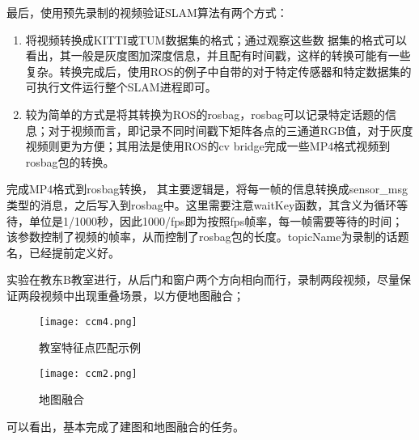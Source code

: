 最后，使用预先录制的视频验证SLAM算法有两个方式：

\begin{enumerate}
	\item 将视频转换成KITTI或TUM数据集的格式；通过观察这些数
	据集的格式可以看出，其一般是灰度图加深度信息，并且配有时间戳，这样的转换可能有一些复杂。转换完成后，使用ROS的例子中自带的对于特定传感器和特定数据集的可执行文件运行整个SLAM进程即可。
	\item 较为简单的方式是将其转换为ROS的rosbag，rosbag可以记录特定话题的信息；对于视频而言，即记录不同时间戳下矩阵各点的三通道RGB值，对于灰度视频则更为方便；其用法是使用ROS的cv bridge完成一些MP4格式视频到rosbag包的转换。
\end{enumerate}

完成MP4格式到rosbag转换，
其主要逻辑是，将每一帧的信息转换成sensor\_msg类型的消息，之后写入到rosbag中。这里需要注意waitKey函数，其含义为循环等待，单位是1/1000秒，因此1000/fps即为按照fps帧率，每一帧需要等待的时间；该参数控制了视频的帧率，从而控制了rosbag包的长度。topicName为录制的话题名，已经提前定义好。

实验在教东B教室进行，从后门和窗户两个方向相向而行，录制两段视频，尽量保证两段视频中出现重叠场景，以方便地图融合；

\begin{figure}[htbp]
	\centering
	\begin{minipage}[t]{0.45\columnwidth} %
		\centering
		\texttt{[image: ccm4.png]}
		\caption{教室特征点匹配示例}
		\label{fig5-1}
	\end{minipage}
	\begin{minipage}[t]{0.45\columnwidth}
		\centering
		\texttt{[image: ccm2.png]}
		\caption{地图融合}
		\label{fig5-2}
	\end{minipage}
\end{figure}

可以看出，基本完成了建图和地图融合的任务。